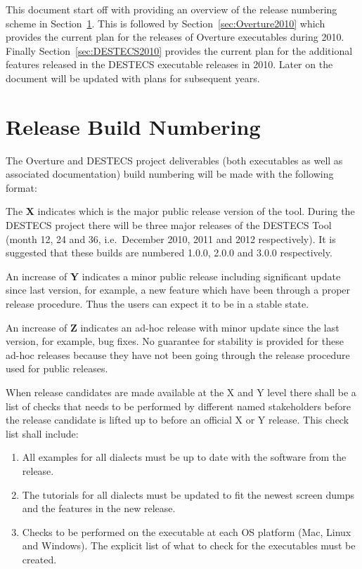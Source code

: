 \documentclass{overturerep}
\begin{document}
This document start off with providing an overview of the release
numbering scheme in Section~\ref{sec:numbering}. This is followed by
Section~\ref{sec:Overture2010} which provides the current plan for the
releases of Overture executables during 2010. Finally
Section~\ref{sec:DESTECS2010} provides the current plan for the
additional features released in the DESTECS executable releases in
2010. Later on the document will be updated with plans for subsequent
years. 

\chapter{Release Build Numbering}\label{sec:numbering}

The Overture and DESTECS project deliverables (both executables as
well as associated documentation) build numbering will be made with
the following format:
\begin{center}
\end{center}

The \textbf{X} indicates which is the major public release version of
the tool. During the DESTECS project there will be three major
releases of the DESTECS Tool (month 12, 24 and 36, i.e.\ December
2010, 2011 and 2012 respectively). It is suggested that these builds
are numbered 1.0.0, 2.0.0 and 3.0.0 respectively.

An increase of \textbf{Y} indicates a minor public release including
significant update since last version, for example, a new feature
which have been through a proper release procedure. Thus the users can
expect it to be in a stable state.

An increase of  \textbf{Z} indicates an ad-hoc release with minor
update since the last version, for example, bug fixes. No guarantee for
stability is provided for these ad-hoc releases because they have not
been going through the release procedure used for public releases.

When release candidates are made available at the X and Y level there
shall be a list of checks that needs to be performed by different
named stakeholders before the
release candidate is lifted up to before an official X or Y
release. This check list shall include:

\begin{enumerate}
\item All examples for all dialects must be up to date with the
  software from the release.
\item The tutorials for all dialects must be updated to fit the newest
  screen dumps and the features in the new release.
\item Checks to be performed on the executable at each OS platform
  (Mac, Linux and Windows). The explicit list of what to check for the
  executables must be created.
\end{enumerate}
\end{document}
